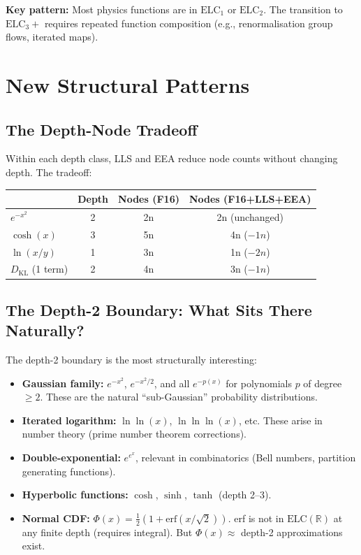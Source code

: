 \documentclass[11pt]{article}
\begin{document}
\noindent \textbf{Key pattern:} Most physics functions are in $\mathrm{ELC}_1$ or $\mathrm{ELC}_2$.
The transition to $\mathrm{ELC}_3+$ requires repeated function composition
(e.g., renormalisation group flows, iterated maps).

\section{New Structural Patterns}
\label{sec:patterns}

\subsection{The Depth-Node Tradeoff}

Within each depth class, LLS and EEA reduce node counts without changing depth.
The tradeoff:

\begin{center}
\begin{tabular}{lccc}
\toprule
& Depth & Nodes (F16) & Nodes (F16+LLS+EEA) \\
\midrule
$e^{-x^2}$ & 2 & 2n & 2n (unchanged) \\
$\cosh(x)$ & 3 & 5n & 4n ($-1n$) \\
$\ln(x/y)$ & 1 & 3n & 1n ($-2n$) \\
$D_\mathrm{KL}$ (1 term) & 2 & 4n & 3n ($-1n$) \\
\bottomrule
\end{tabular}
\end{center}

\subsection{The Depth-2 Boundary: What Sits There Naturally?}

The depth-2 boundary is the most structurally interesting:
\begin{itemize}
  \item \textbf{Gaussian family:} $e^{-x^2}$, $e^{-x^2/2}$, and all
        $e^{-p(x)}$ for polynomials $p$ of degree $\geq 2$.
        These are the natural ``sub-Gaussian'' probability distributions.
  \item \textbf{Iterated logarithm:} $\ln\ln(x)$, $\ln\ln\ln(x)$, etc.
        These arise in number theory (prime number theorem corrections).
  \item \textbf{Double-exponential:} $e^{e^x}$, relevant in combinatorics
        (Bell numbers, partition generating functions).
  \item \textbf{Hyperbolic functions:} $\cosh$, $\sinh$, $\tanh$ (depth 2--3).
  \item \textbf{Normal CDF:} $\Phi(x) = \frac{1}{2}(1 + \mathrm{erf}(x/\sqrt{2}))$.
        erf is not in $\mathrm{ELC}(\mathbb{R})$ at any finite depth (requires integral).
        But $\Phi(x) \approx$ depth-2 approximations exist.
\end{itemize}
\end{document}

